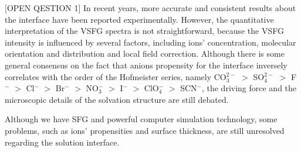 [OPEN QESTION 1]
In recent years, more accurate and consistent results about the interface have been reported experimentally\cite{TianCS2009,Shen2013}. 
However, the quantitative interpretation of the VSFG spectra is not straightforward, because the VSFG intensity is influenced by several factors, including ions' concentration, 
molecular orientation and distribution and local field correction\cite{Morita2008}.
Although there is some general consensus on the fact that anions propensity for the interface inversely correlates with
the order of the Hofmeister series, namely 
CO$_3^{2-}$ $>$  SO$_4^{2-}$ $>$ F$^-$ $>$ Cl$^-$ $>$ Br$^-$ $>$ NO$_3^-$ $>$ I$^-$ $>$ ClO$_4^-$ $>$ SCN$^-$\cite{PJ06,ZYJ10,DT08,Parsons2011,HuaWei2013}, 
the driving force and the microscopic details of the solvation structure are still debated. 

Although we have SFG and powerful computer simulation technology, some problems, such as ions' propensities and surface thickness, are still unresolved regarding the solution interface.

